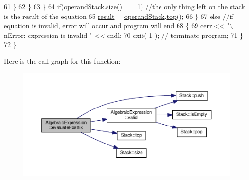 \begin{DoxyCode}
{          }
61             \}
62          \}
63       \}
64       \textcolor{keywordflow}{if}(\hyperlink{classAlgebraicExpression_a8f0ee1ac59e782a546a7de47e507b391}{operandStack}.\hyperlink{classStack_a3091d98f798b1b3e69b644d5b778c428}{size}() == 1) \textcolor{comment}{//the only thing left on the stack is the result of the
       equation                                                                                                    
           }
65          \hyperlink{classAlgebraicExpression_a13af7ae171ff8616e6ab013a9cee9d75}{result} = \hyperlink{classAlgebraicExpression_a8f0ee1ac59e782a546a7de47e507b391}{operandStack}.\hyperlink{classStack_ad461f6de40c8672dbf743068f4515061}{top}();
66    \}
67    \textcolor{keywordflow}{else} \textcolor{comment}{//if equation is invalid, error will occur and program will end                                    
                                                                                                       }
68    \{
69       cerr << \textcolor{stringliteral}{"\(\backslash\)nError: expression is invalid "} << endl;
70       exit( 1 ); \textcolor{comment}{// terminate program;                                                                     
                                                                                                       }
71    \}
72 \}
\end{DoxyCode}


Here is the call graph for this function\+:
\nopagebreak
\begin{figure}[H]
\begin{center}
\leavevmode
\includegraphics[width=350pt]{classAlgebraicExpression_ac0428ac1f1072f14e1391527baebd330_cgraph}
\end{center}
\end{figure}



